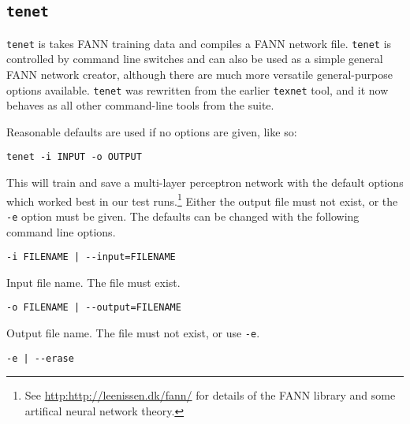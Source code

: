 \documentclass[12pt,a4paper]{article}
\newcommand{\Maro}[1]{\marginpar{\tiny\texttt{#1}}}
\newenvironment{bx}
{
  \begin{center}
  \begin{boxedminipage}[h]{0.9\textwidth}
  \small
}
{
  \end{boxedminipage}
  \end{center}
}
\begin{document}
\subsection{\texttt{tenet}}
\label{sec:tenet}

\texttt{tenet} is takes FANN training data and compiles a FANN network file.
\texttt{tenet} is controlled by command line switches and can also be used as a simple general FANN network creator, although there are much more versatile general-purpose options available.
\texttt{tenet} was rewritten from the earlier \texttt{texnet} tool, and it now behaves as all other command-line tools from the suite.

Reasonable defaults are used if no options are given, like so:

\begin{bx}
\begin{verbatim}
tenet -i INPUT -o OUTPUT
\end{verbatim}
\end{bx}

This will train and save a multi-layer perceptron network with the default options which worked best in our test runs.\footnote{See \url{http:http://leenissen.dk/fann/} for details of the FANN library and some artifical neural network theory.}
Either the output file must not exist, or the \texttt{-e} option must be given.
The defaults can be changed with the following command line options.

\begin{center}\Maro{-i|-{-}input}
\begin{verbatim}
-i FILENAME | --input=FILENAME
\end{verbatim}
\end{center}

Input file name.
The file must exist.

\begin{center}\Maro{-o|-{-}output}
\begin{verbatim}
-o FILENAME | --output=FILENAME
\end{verbatim}
\end{center}

Output file name.
The file must not exist, or use \texttt{-e}.

\begin{center}\Maro{-e|-{-}erase}
\begin{verbatim}
-e | --erase
\end{verbatim}
\end{center}
\end{document}
